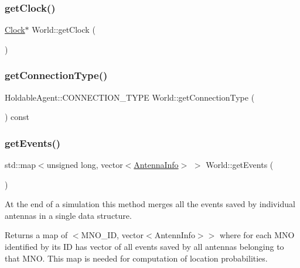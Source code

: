 \subsubsection{\texorpdfstring{get\+Clock()}{getClock()}}
{\footnotesize\ttfamily \hyperlink{class_clock}{Clock}$\ast$ World\+::get\+Clock (\begin{DoxyParamCaption}{ }\end{DoxyParamCaption})}

\mbox{\label{class_world_a35aafc469b9146b4b6f72c6adaa3e067}} 
\subsubsection{\texorpdfstring{get\+Connection\+Type()}{getConnectionType()}}
{\footnotesize\ttfamily Holdable\+Agent\+::\+C\+O\+N\+N\+E\+C\+T\+I\+O\+N\+\_\+\+T\+Y\+PE World\+::get\+Connection\+Type (\begin{DoxyParamCaption}{ }\end{DoxyParamCaption}) const\hspace{0.3cm}{\ttfamily [private]}}

\mbox{\label{class_world_a65eab81f8a895b605cbc90d887d0671a}} 
\subsubsection{\texorpdfstring{get\+Events()}{getEvents()}}
{\footnotesize\ttfamily std\+::map$<$unsigned long, vector$<$\hyperlink{class_antenna_info}{Antenna\+Info}$>$ $>$ World\+::get\+Events (\begin{DoxyParamCaption}{ }\end{DoxyParamCaption})}

At the end of a simulation this method merges all the events saved by individual antennas in a single data structure. \begin{DoxyReturn}{Returns}
a map of $<$M\+N\+O\+\_\+\+ID, vector$<$\+Antenn\+Info$>$$>$ where for each M\+NO identified by its ID has vector of all events saved by all antennas belonging to that M\+NO. This map is needed for computation of location probabilities. 
\end{DoxyReturn}
\mbox{\label{class_world_a7d07b06f9884185161c5cc34034a7212}} 
